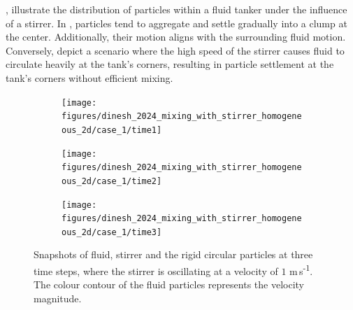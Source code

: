\documentclass[preprint,12pt]{elsarticle}
\begin{document}
, illustrate the
distribution of particles within a fluid tanker under the influence of a
stirrer.  In , particles tend to aggregate and settle
gradually into a clump at the center. Additionally, their motion aligns with
the surrounding fluid motion. Conversely, 
depict a scenario where the high speed of the stirrer causes fluid to
circulate heavily at the tank's corners, resulting in particle
settlement at the tank's corners without efficient mixing.
\begin{figure}[!htpb]
  \centering
  \begin{subfigure}{0.48\textwidth}
    \centering
    \texttt{[image: figures/dinesh\_2024\_mixing\_with\_stirrer\_homogeneous\_2d/case\_1/time1]}
    \label{fig:1-mixing-1-a}
  \end{subfigure}
  \begin{subfigure}{0.48\textwidth}
    \centering
    \texttt{[image: figures/dinesh\_2024\_mixing\_with\_stirrer\_homogeneous\_2d/case\_1/time2]}
    \label{fig:1-mixing-1-b}
  \end{subfigure}

  \begin{subfigure}{0.48\textwidth}
    \centering
    \texttt{[image: figures/dinesh\_2024\_mixing\_with\_stirrer\_homogeneous\_2d/case\_1/time3]}
    \label{fig:1-mixing-1-c}
  \end{subfigure}
  \caption{Snapshots of fluid, stirrer and the rigid circular particles at
    three time steps, where the stirrer is oscillating at a velocity of $1$
    m\,s\textsuperscript{-1}. The colour contour of the fluid particles
    represents the velocity magnitude.}
\label{fig:1-mixing-1}
\end{figure}
\end{document}
